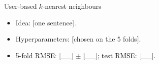 
\begin{frame}{User-based $k$-nearest neighbours}
  \begin{itemize}
    \item Idea: [one sentence].
    \item Hyperparameters: [chosen on the 5 folds].
    \item 5-fold RMSE: [\_\_] $\pm$ [\_\_]; test RMSE: [\_\_].
  \end{itemize}
\end{frame}
